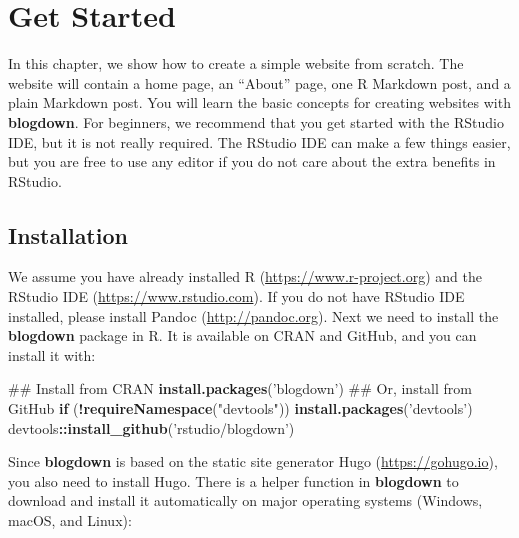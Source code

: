 \documentclass[12pt,]{krantz}
\makeatletter
\newenvironment{Shaded}{\begin{snugshade}}{\end{snugshade}}
\newcommand{\ControlFlowTok}[1]{\textcolor[rgb]{0.13,0.29,0.53}{\textbf{#1}}}
\newcommand{\KeywordTok}[1]{\textcolor[rgb]{0.13,0.29,0.53}{\textbf{#1}}}
\newcommand{\NormalTok}[1]{#1}
\newcommand{\OperatorTok}[1]{\textcolor[rgb]{0.81,0.36,0.00}{\textbf{#1}}}
\newcommand{\StringTok}[1]{\textcolor[rgb]{0.31,0.60,0.02}{#1}}
\newenvironment{kframe}{%
\medskip{}
\setlength{\fboxsep}{.8em}
 \def\at@end@of@kframe{}%
 \ifinner\ifhmode%
  \def\at@end@of@kframe{\end{minipage}}%
  \begin{minipage}{\columnwidth}%
 \fi\fi%
 \def\FrameCommand##1{\hskip\@totalleftmargin \hskip-\fboxsep
 \colorbox{shadecolor}{##1}\hskip-\fboxsep
     \hskip-\linewidth \hskip-\@totalleftmargin \hskip\columnwidth}%
 \MakeFramed {\advance\hsize-\width
   \@totalleftmargin\z@ \linewidth\hsize
   \@setminipage}}%
 {\par\unskip\endMakeFramed%
 \at@end@of@kframe}
\renewenvironment{Shaded}{\begin{kframe}}{\end{kframe}}
\theoremstyle{definition}
\theoremstyle{definition}
\theoremstyle{definition}
\theoremstyle{remark}
\makeatother
\begin{document}
\mainmatter

\hypertarget{get-started}{%
\chapter{Get Started}\label{get-started}}

In this chapter, we show how to create a simple website from scratch.
The website will contain a home page, an ``About'' page, one R Markdown
post, and a plain Markdown post. You will learn the basic concepts for
creating websites with \textbf{blogdown}. For beginners, we recommend
that you get started with the RStudio IDE, but it is not really
required. The RStudio IDE can make a few things easier, but you are free
to use any editor if you do not care about the extra benefits in
RStudio.

\hypertarget{installation}{%
\section{Installation}\label{installation}}

We assume you have already installed R (\url{https://www.r-project.org})
\citep{R-base} and the RStudio IDE (\url{https://www.rstudio.com}). If
you do not have RStudio IDE installed, please install
Pandoc (\url{http://pandoc.org}). Next we need to install
the \textbf{blogdown} package in R. It is available on CRAN and GitHub,
and you can install it with:

\begin{Shaded}
\begin{Highlighting}[]
\NormalTok{## Install from CRAN}
\KeywordTok{install.packages}\NormalTok{(}\StringTok{'blogdown'}\NormalTok{) }
\NormalTok{## Or, install from GitHub}
\ControlFlowTok{if}\NormalTok{ (}\OperatorTok{!}\KeywordTok{requireNamespace}\NormalTok{(}\StringTok{"devtools"}\NormalTok{)) }\KeywordTok{install.packages}\NormalTok{(}\StringTok{'devtools'}\NormalTok{)}
\NormalTok{devtools}\OperatorTok{::}\KeywordTok{install_github}\NormalTok{(}\StringTok{'rstudio/blogdown'}\NormalTok{)}
\end{Highlighting}
\end{Shaded}

Since \textbf{blogdown} is based on the static site generator Hugo
(\url{https://gohugo.io}), you also need to install Hugo.
There is a helper function in \textbf{blogdown} to download and install
it automatically on major operating systems (Windows, macOS, and Linux):
\end{document}
